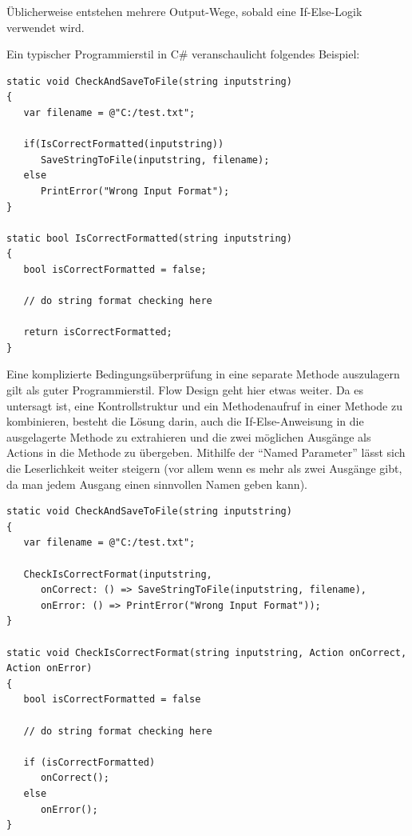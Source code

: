 Üblicherweise entstehen mehrere Output-Wege, sobald eine
If-Else-Logik verwendet wird.

\pagebreak

Ein typischer Programmierstil in C\# veranschaulicht folgendes Beispiel:
\begin{lstlisting}[caption= {Typerischer Programmierstil, der nicht IOSP-konform ist}]
static void CheckAndSaveToFile(string inputstring)
{
   var filename = @"C:/test.txt";

   if(IsCorrectFormatted(inputstring))
      SaveStringToFile(inputstring, filename);
   else
      PrintError("Wrong Input Format");
}

static bool IsCorrectFormatted(string inputstring)
{
   bool isCorrectFormatted = false;

   // do string format checking here

   return isCorrectFormatted;
}
\end{lstlisting}

Eine komplizierte Bedingungsüberprüfung in eine separate Methode auszulagern
gilt als guter Programmierstil. Flow Design geht hier etwas weiter. Da es
untersagt ist, eine Kontrollstruktur und ein Methodenaufruf in einer
Methode zu kombinieren, besteht die Lösung darin, auch die If-Else-Anweisung in
die ausgelagerte Methode zu extrahieren und die zwei möglichen Ausgänge als Actions
in die Methode zu übergeben. Mithilfe der \enquote{Named Parameter} lässt sich die
Leserlichkeit weiter steigern (vor allem wenn es mehr als zwei Ausgänge
gibt, da man jedem Ausgang einen sinnvollen Namen geben kann).

\begin{lstlisting}[caption= {IOSP-konforme Variante}]
static void CheckAndSaveToFile(string inputstring)
{
   var filename = @"C:/test.txt";

   CheckIsCorrectFormat(inputstring, 
      onCorrect: () => SaveStringToFile(inputstring, filename),
      onError: () => PrintError("Wrong Input Format"));
}

static void CheckIsCorrectFormat(string inputstring, Action onCorrect, Action onError)
{
   bool isCorrectFormatted = false

   // do string format checking here

   if (isCorrectFormatted) 
      onCorrect();
   else
      onError();
}
\end{lstlisting}

